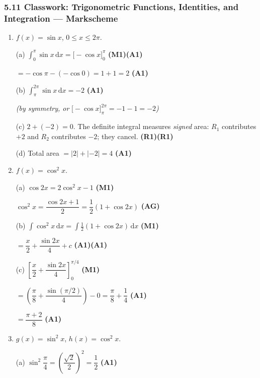 \documentclass[12pt, twoside]{article}
\begin{document}
\subsubsection*{5.11 Classwork: Trigonometric Functions, Identities, and Integration
--- Markscheme}

\begin{enumerate}[itemsep=0.4cm]

\item $f(x) = \sin x$, \quad $0 \leq x \leq 2\pi$.

(a) $\displaystyle\int_0^{\pi} \sin x \,\mathrm{d}x
= \bigl[-\cos x\bigr]_0^{\pi}$ \hfill \textbf{(M1)(A1)}

$= -\cos\pi - (-\cos 0) = 1 + 1 = 2$ \hfill \textbf{(A1)}

\medskip
(b) $\displaystyle\int_{\pi}^{2\pi} \sin x \,\mathrm{d}x = -2$
\hfill \textbf{(A1)}

\emph{(by symmetry, or}
$\bigl[-\cos x\bigr]_{\pi}^{2\pi} = -1 - 1 = -2$\emph{)}

\medskip
(c) $2 + (-2) = 0$. The definite integral measures \emph{signed} area:
$R_1$ contributes $+2$ and $R_2$ contributes $-2$; they cancel.
\hfill \textbf{(R1)(R1)}

\medskip
(d) Total area $= |2| + |-2| = 4$ \hfill \textbf{(A1)}

\bigskip

\item $f(x) = \cos^2 x$.

(a) $\cos 2x = 2\cos^2 x - 1$ \hfill \textbf{(M1)}

$\cos^2 x = \dfrac{\cos 2x + 1}{2} = \dfrac{1}{2}(1 + \cos 2x)$
\hfill \textbf{(AG)}

\medskip
(b) $\displaystyle\int \cos^2 x \,\mathrm{d}x
= \int \tfrac{1}{2}(1 + \cos 2x)\,\mathrm{d}x$ \hfill \textbf{(M1)}

$= \dfrac{x}{2} + \dfrac{\sin 2x}{4} + c$ \hfill \textbf{(A1)(A1)}

\medskip
(c) $\left[\dfrac{x}{2} + \dfrac{\sin 2x}{4}\right]_0^{\pi/4}$
\hfill \textbf{(M1)}

$= \left(\dfrac{\pi}{8} + \dfrac{\sin(\pi/2)}{4}\right) - 0
= \dfrac{\pi}{8} + \dfrac{1}{4}$ \hfill \textbf{(A1)}

$= \dfrac{\pi + 2}{8}$ \hfill \textbf{(A1)}

\bigskip

\item $g(x) = \sin^2 x$, \quad $h(x) = \cos^2 x$.

(a) $\sin^2\!\dfrac{\pi}{4}
= \left(\dfrac{\sqrt{2}}{2}\right)^{\!2} = \dfrac{1}{2}$
\hfill \textbf{(A1)}


\end{enumerate}
\end{document}
